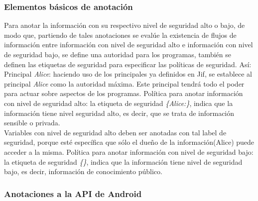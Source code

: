 \subsubsection{Elementos básicos de anotación}
\label{subsec:elements}
Para anotar la información con su respectivo nivel de seguridad alto o bajo, de
modo que, partiendo de tales anotaciones se evalúe la existencia de flujos de
información entre información con nivel de seguridad alto e información con
nivel de seguridad bajo, se define una autoridad para los programas, también se
definen las etiquetas de seguridad para especificar las políticas de seguridad.
Así:\newline 
Principal \emph{Alice}: haciendo uso de los principales ya definidos en Jif, se
establece al principal \emph{Alice} como la autoridad máxima. Este principal
tendrá todo el poder para actuar sobre aspectos de los programas.\newline
Política para anotar información con nivel de seguridad alto: la etiqueta de
seguridad \emph{\{Alice:\}},  indica que la información tiene nivel seguridad
alto, es decir, que se trata de información sensible o privada.\\
Variables con nivel de seguridad alto deben ser anotadas con tal label de
seguridad, porque esté específica que sólo el dueño de la información(Alice)
puede acceder a la misma.\newline 
Política para anotar información con nivel de seguridad bajo: la etiqueta de
seguridad \emph{\{\}}, indica que la información tiene nivel de seguridad bajo,
es decir, información de conocimiento público.\newline


\subsubsection{Anotaciones a la API de Android}
\label{subsec:api}

